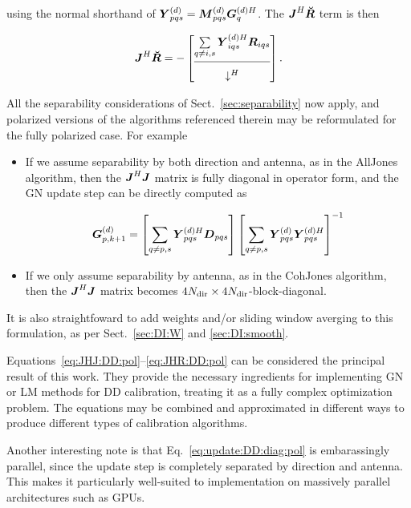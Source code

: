 \documentclass[useAMS,usenatbib]{mn2e}
\newcommand{\mat}[1]{{\bmath{#1}}}
\newcommand{\JJ}{\mat{J}} %
\newcommand{\DD}{\mat{D}}
\newcommand{\RR}{\mat{R}}
\newcommand{\JHJ}{\JJ^H\JJ} %
\begin{document}
using the normal shorthand of $\YYd_{pqs} = \MMd_{pqs} \GGdH_q$. The $\JJ^H\RRr$ term is then

\newcommand{\CCC}{\mathcal{C}}

\begin{equation}
\label{eq:JHR:DD:pol}
\JJ^H\RRr = -\Matrix{c}{
\sum\limits_{q\ne i,s} \YYdH_{iqs} \RR_{iqs} \\
\hline\\[-8pt]
\downarrow^H}.
\end{equation}

All the separability considerations of Sect.~\ref{sec:separability} now apply, and polarized versions of the 
algorithms referenced therein may be reformulated for the fully polarized case. For example

\begin{itemize} 

\item If we assume separability by both direction and antenna, as in the {\sc AllJones} algorithm, then
the $\JHJ$ matrix is fully diagonal in operator form, and the GN update step can be directly computed as

\begin{equation}
\label{eq:update:DD:diag:pol}
\GGd_{p,k+1} = \left [ \sum\limits_{q\ne p,s} \YYdH_{pqs} \DD_{pqs} \right ] 
\left [ \sum\limits_{q\ne p,s} \YYd_{pqs} \YYdH_{pqs}  \right ]^{-1}
\end{equation}

\item If we only assume separability by antenna, as in the {\sc CohJones} algorithm, then the $\JHJ$ matrix 
becomes $4N_\mathrm{dir}\times4N_\mathrm{dir}$-block-diagonal.
\end{itemize}

It is also straightfoward to add weights and/or sliding window averging to this formulation, as per 
Sect.~\ref{sec:DI:W} and \ref{sec:DI:smooth}.

Equations~\ref{eq:JHJ:DD:pol}--\ref{eq:JHR:DD:pol} can be considered the principal result of this work.
They provide the necessary ingredients for implementing GN or LM methods for DD calibration, treating it as a 
fully complex optimization problem. The equations may be combined and approximated in different 
ways to produce different types of calibration algorithms. 

Another interesting note is that Eq.~\ref{eq:update:DD:diag:pol} is embarassingly parallel, since the update step is 
completely separated by direction and antenna. This makes it particularly well-suited to implementation on massively 
parallel architectures such as GPUs.
\end{document}
